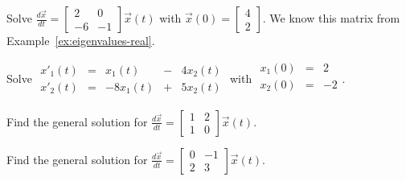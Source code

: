 \documentclass[../main.tex]{subfiles}
\begin{document}
\begin{example} \label{ex:system-de-homog-ivp}
  Solve \( \frac{d\vec{x}}{dt} = \begin{bmatrix} 2   & 0  \\ -6 & -1 \end{bmatrix} \vec{x}(t) \) with \(\vec{x}(0) = \begin{bmatrix} 4 \\ 2 \end{bmatrix}\).
  We know this matrix from Example~\ref{ex:eigenvalues-real}.

  \blanks*
\end{example}
\clearpage

\begin{example} \label{ex:system-de-homog-second}
  Solve 
  \(
  \begin{array}{rcrcr}
    x'_{1}(t) &=&    x_{1}(t) &-& 4x_{2}(t) \\
    x'_{2}(t) &=& -8 x_{1}(t) &+& 5x_{2}(t)
  \end{array}
  \) with \(
  \begin{array}{rcr}
    x_{1}(0) &=&  2 \\
    x_{2}(0) &=& -2 \\
  \end{array}
  \).

  \blanks*

\end{example}
\clearpage


\begin{exercise} \label{ex:system-de-homog-general-1}
  Find the general solution for \( \frac{d\vec{x}}{dt} = \begin{bmatrix} 1 & 2  \\ 1 & 0 \end{bmatrix} \vec{x}(t) \).

  \blanks*
\end{exercise}
\clearpage

\begin{exercise} \label{ex:system-de-homog-general-2}
  Find the general solution for \( \frac{d\vec{x}}{dt} = \begin{bmatrix} 0 & -1  \\ 2 & 3 \end{bmatrix} \vec{x}(t) \).

  \blanks*
\end{exercise}
\clearpage
\end{document}
